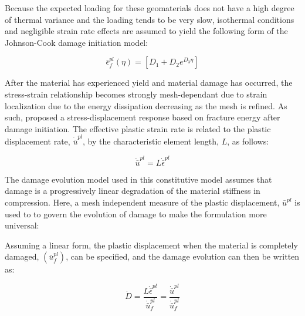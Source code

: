 Because the expected loading for these geomaterials does not have a high degree of thermal variance and the loading tends to be very slow, isothermal conditions and negligible strain rate effects are assumed to yield the following form of the Johnson-Cook damage initiation model:

\begin{equation}
\bar{\epsilon}_{f}^{pl}\left(\eta\right)=\left[D_{1}+D_{2}e^{D_{3}\eta}\right]\label{eqn:druc8}
\end{equation}

After the material has experienced yield and material damage has occurred, the stress-strain relationship becomes strongly mesh-dependant due to strain localization due to the energy dissipation decreasing as the mesh is refined. As such, \citet{Hillerborg_1976} proposed a stress-displacement response based on fracture energy after damage initiation. The effective plastic strain rate is related to the plastic displacement rate, $\dot{\bar{u}}^{pl}$, by the characteristic element length, $L$, as follows:

\begin{equation}
\dot{\bar{u}}^{pl}=L\dot{\bar{\epsilon}}^{pl}\label{eqn:druc9}
\end{equation}

The damage evolution model used in this constitutive model assumes that damage is a progressively linear degradation of the material stiffness in compression.  Here, a mesh independent measure of the plastic displacement, $\bar{u}^{pl}$ is used to to govern the evolution of damage to make the formulation more universal:


Assuming a linear form, the plastic displacement when the material is completely damaged, $(\bar{u}^{pl}_f)$, can be specified, and the damage evolution can then be written as:

\begin{equation}
\dot{D}=\frac{L\dot{\bar{\epsilon}}^{pl}}{\dot{\bar{u}}_{f}^{pl}}=\frac{\dot{\bar{u}}^{pl}}{\dot{\bar{u}}_{f}^{pl}}\label{eqn:druc9-1}
\end{equation}

